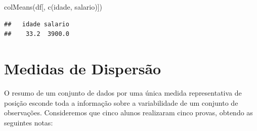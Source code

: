 \documentclass[
]{book}
\newenvironment{Shaded}{\begin{snugshade}}{\end{snugshade}}
\newcommand{\FunctionTok}[1]{\textcolor[rgb]{0.00,0.00,0.00}{#1}}
\newcommand{\NormalTok}[1]{#1}
\newcommand{\StringTok}[1]{\textcolor[rgb]{0.31,0.60,0.02}{#1}}
\begin{document}
\begin{Shaded}
\begin{Highlighting}[]
\FunctionTok{colMeans}\NormalTok{(df[, }\FunctionTok{c}\NormalTok{(}\StringTok{\textquotesingle{}idade\textquotesingle{}}\NormalTok{, }\StringTok{\textquotesingle{}salario\textquotesingle{}}\NormalTok{)])}
\end{Highlighting}
\end{Shaded}

\begin{verbatim}
##   idade salario 
##    33.2  3900.0
\end{verbatim}

\hypertarget{medidas-de-dispersuxe3o}{%
\section{Medidas de Dispersão}\label{medidas-de-dispersuxe3o}}

O resumo de um conjunto de dados por uma única medida representativa de posição esconde toda a informação sobre a variabilidade de um conjunto de observações. Consideremos que cinco alunos realizaram cinco provas, obtendo as seguintes notas:
\end{document}

